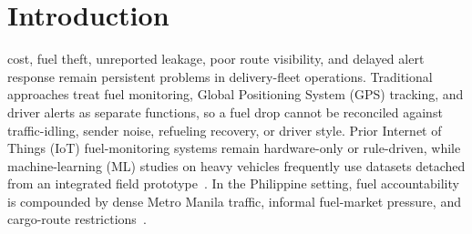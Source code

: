 \documentclass[10pt,journal]{IEEEtran}
\begin{document}
\def\@evenhead{\@IEEEheaderstyle\raisebox{-\baselineskip}{\thepage}\hfil
  \parbox[b]{\dimexpr\textwidth-2em\relax}{\raggedright \MakeUppercase{\ArticleHeaderA}\\ \MakeUppercase{\ArticleHeaderB}}%
  \hbox{}}
\let\@oddfoot\@empty
\let\@evenfoot\@empty
\renewcommand{\ps@IEEEtitlepagestyle}{%
  \def\@oddhead{\hbox{}\@IEEEheaderstyle
    \parbox[b]{\dimexpr\textwidth-2em\relax}{\raggedright \MakeUppercase{\ArticleHeaderA}\\ \MakeUppercase{\ArticleHeaderB}}%
    \hfil\raisebox{-\baselineskip}{\thepage}}%
  \def\@evenhead{\@IEEEheaderstyle\raisebox{-\baselineskip}{\thepage}\hfil
    \parbox[b]{\dimexpr\textwidth-2em\relax}{\raggedright \MakeUppercase{\ArticleHeaderA}\\ \MakeUppercase{\ArticleHeaderB}}%
    \hbox{}}%
  \let\@oddfoot\@empty
  \let\@evenfoot\@empty
}
\thispagestyle{headings}
\makeatother
\markboth{\ArticleHeaderA\ \ArticleHeaderB}{\ArticleHeaderA\ \ArticleHeaderB}

\section{Introduction}
 cost, fuel theft, unreported leakage, poor route visibility, and delayed alert response remain persistent problems in delivery-fleet operations. Traditional approaches treat fuel monitoring, Global Positioning System (GPS) tracking, and driver alerts as separate functions, so a fuel drop cannot be reconciled against traffic-idling, sender noise, refueling recovery, or driver style. Prior Internet of Things (IoT) fuel-monitoring systems remain hardware-only or rule-driven, while machine-learning (ML) studies on heavy vehicles frequently use datasets detached from an integrated field prototype~\cite{mumcuoglu2023fuel}. In the Philippine setting, fuel accountability is compounded by dense Metro Manila traffic, informal fuel-market pressure, and cargo-route restrictions~\cite{jica2022metro_traffic,adb2016fuel_smuggling}.
\end{document}
